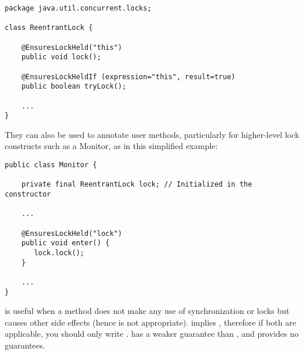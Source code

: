\begin{Verbatim}
package java.util.concurrent.locks;

class ReentrantLock {

    @EnsuresLockHeld("this")
    public void lock();

    @EnsuresLockHeldIf (expression="this", result=true)
    public boolean tryLock();

    ...
}
\end{Verbatim}

They can also be used to annotate user methods, particularly for
higher-level lock constructs such as a Monitor, as in this simplified example:

\begin{Verbatim}
public class Monitor {

    private final ReentrantLock lock; // Initialized in the constructor

    ...

    @EnsuresLockHeld("lock")
    public void enter() {
       lock.lock();
    }

    ...
}
\end{Verbatim}


 is useful when a method does not make any use of synchronization
or locks but causes other side effects (hence  is not appropriate).
 implies , therefore if both are applicable,
you should only write .  has a weaker guarantee
than , and  provides no guarantees.


